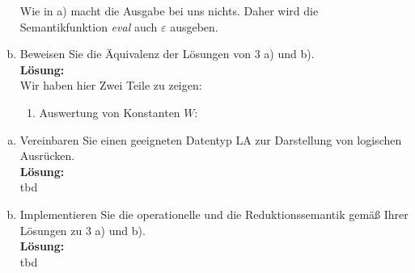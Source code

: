 \documentclass[11pt,a4paper,ngerman]{article}
\begin{document}
\begin{enumerate}[a)]
            Wie in a) macht die Ausgabe bei uns nichts. Daher wird die Semantikfunktion \emph{eval} auch
            $\varepsilon$ ausgeben.
            
    \item   Beweisen Sie die Äquivalenz der Lösungen von 3 a) und b).\\
            \textbf{Lösung:}\\

            Wir haben hier Zwei Teile zu zeigen:
            \begin{enumerate}[I]
                \item   Auswertung von Konstanten $W$:
                        $$
                            
                        $$
            \end{enumerate}
\end{enumerate}


\begin{enumerate}[a)]
    \item   Vereinbaren Sie einen geeigneten Datentyp LA zur Darstellung 
            von logischen Ausrücken.\\
            \textbf{Lösung:}\\
            tbd


    \item   Implementieren Sie die operationelle und die Reduktionssemantik
            gemäß Ihrer Lösungen zu 3 a) und b).\\
            \textbf{Lösung:}\\
            tbd


\end{enumerate}
\label{LastPage}
\end{document}
